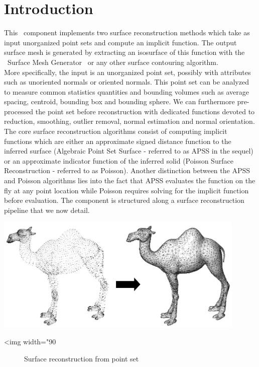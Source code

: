 \section{Introduction}

This \cgal\ component implements two surface reconstruction methods which take as input unorganized point sets and compute an implicit function. The output surface mesh is generated by extracting an isosurface of this function with the \cgal\ Surface Mesh Generator~\cite{cgal:ry-gsddrm-06} or any other surface contouring algorithm. \\

More specifically, the input is an unorganized point set, possibly with attributes such as unoriented normals or oriented normals. This point set can be analyzed to measure common statistics quantities and bounding volumes such as average spacing, centroid, bounding box and bounding sphere. We can furthermore pre-processed the point set before reconstruction with dedicated functions devoted to reduction, smoothing, outlier removal, normal estimation and normal orientation.\\

The core surface reconstruction algorithms consist of computing implicit functions which are either an approximate signed distance function to the inferred surface (Algebraic Point Set Surface - referred to as APSS in the sequel) or an approximate indicator function of the inferred solid (Poisson Surface Reconstruction - referred to as Poisson). Another distinction between the APSS and Poisson algorithms lies into the fact that APSS evaluates the function on the fly at any point location while Poisson requires solving for the implicit function before evaluation. The component is structured along a surface reconstruction pipeline that we now detail. 

\begin{center}
    \label{Surface_reconstruction_3-fig-introduction}
    \begin{ccTexOnly}
        \includegraphics[width=0.9\textwidth]{Surface_reconstruction_3/introduction} %
    \end{ccTexOnly}
    \begin{ccHtmlOnly}
        <img width="90%
    \end{ccHtmlOnly}
    \begin{figure}[h]
        \caption{Surface reconstruction from point set}
    \end{figure}
\end{center}

